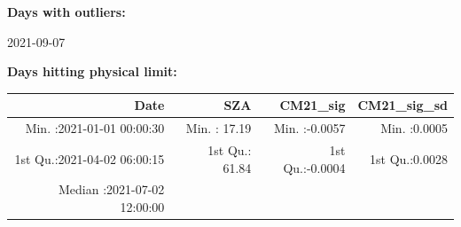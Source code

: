 \documentclass[
  10pt,
  a4paper,oneside]{article}
\begin{document}
\normalsize

\textbf{Days with outliers:}

2021-09-07

\textbf{Days hitting physical limit:}

\footnotesize

\begin{longtable}[]{@{}rrrr@{}}
\toprule
\begin{minipage}[b]{0.32\columnwidth}\raggedleft
Date\strut
\end{minipage} & \begin{minipage}[b]{0.18\columnwidth}\raggedleft
SZA\strut
\end{minipage} & \begin{minipage}[b]{0.19\columnwidth}\raggedleft
CM21\_sig\strut
\end{minipage} & \begin{minipage}[b]{0.19\columnwidth}\raggedleft
CM21\_sig\_sd\strut
\end{minipage}\tabularnewline
\midrule
\endhead
\begin{minipage}[t]{0.32\columnwidth}\raggedleft
Min. :2021-01-01 00:00:30\strut
\end{minipage} & \begin{minipage}[t]{0.18\columnwidth}\raggedleft
Min. : 17.19\strut
\end{minipage} & \begin{minipage}[t]{0.19\columnwidth}\raggedleft
Min. :-0.0057\strut
\end{minipage} & \begin{minipage}[t]{0.19\columnwidth}\raggedleft
Min. :0.0005\strut
\end{minipage}\tabularnewline
\begin{minipage}[t]{0.32\columnwidth}\raggedleft
1st Qu.:2021-04-02 06:00:15\strut
\end{minipage} & \begin{minipage}[t]{0.18\columnwidth}\raggedleft
1st Qu.: 61.84\strut
\end{minipage} & \begin{minipage}[t]{0.19\columnwidth}\raggedleft
1st Qu.:-0.0004\strut
\end{minipage} & \begin{minipage}[t]{0.19\columnwidth}\raggedleft
1st Qu.:0.0028\strut
\end{minipage}\tabularnewline
\begin{minipage}[t]{0.32\columnwidth}\raggedleft
Median :2021-07-02 12:00:00\strut
\end{minipage} & \begin{minipage}[t]{0.18\columnwidth}\raggedleft

\end{minipage}
\end{longtable}
\end{document}
